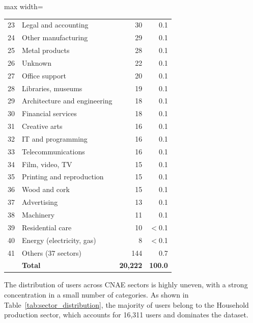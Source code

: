 ﻿\documentclass[12pt,reqno, twoside]{amsbook}
\numberwithin{figure}{chapter}
\numberwithin{table}{chapter}
\numberwithin{equation}{chapter}
\theoremstyle{plain}
\numberwithin{equation}{chapter}
\numberwithin{section}{chapter}
\begin{document}
\begin{table}[htbp]
\begin{adjustbox}{max width=\textwidth}
\begin{tabular}{clrr}
23 & Legal and accounting                  &     30   &  0.1 \\
24 & Other manufacturing                   &     29   &  0.1 \\
25 & Metal products                        &     28   &  0.1 \\
26 & Unknown                               &     22   &  0.1 \\
27 & Office support                        &     20   &  0.1 \\
28 & Libraries, museums                    &     19   &  0.1 \\
29 & Architecture and engineering          &     18   &  0.1 \\
30 & Financial services                    &     18   &  0.1 \\
31 & Creative arts                         &     16   &  0.1 \\
32 & IT and programming                    &     16   &  0.1 \\
33 & Telecommunications                    &     16   &  0.1 \\
34 & Film, video, TV                       &     15   &  0.1 \\
35 & Printing and reproduction             &     15   &  0.1 \\
36 & Wood and cork                         &     15   &  0.1 \\
37 & Advertising                           &     13   &  0.1 \\
38 & Machinery                             &     11   &  0.1 \\
39 & Residential care                      &     10   & $<$0.1 \\
40 & Energy (electricity, gas)             &      8   & $<$0.1 \\
41 & Others (37 sectors)                   &    144   &  0.7 \\

   & \textbf{Total}                        & \textbf{20{,}222} & \textbf{100.0} \\
\bottomrule
\end{tabular}
\end{adjustbox}
\end{table}

The distribution of users across \ac{CNAE} sectors is highly uneven, with a strong concentration in a small number of categories. As shown in Table~\ref{tab:sector_distribution}, the majority of users belong to the Household production sector, which accounts for 16,311 users and dominates the dataset.
\end{document}
